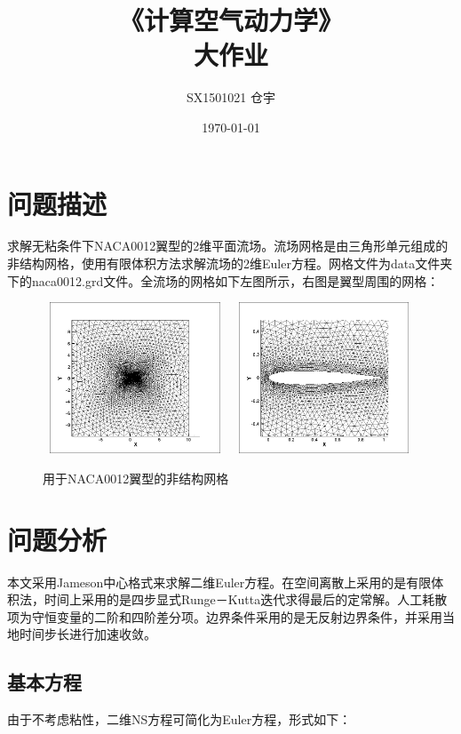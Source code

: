 \documentclass[UTF8]{ctexart}
\title{\heiti 《计算空气动力学》 \\ 大作业}
\author{SX1501021 仓宇}
\date{\today}
\begin{document}
\maketitle
\setcounter{page}{0}
\thispagestyle{empty}
\clearpage

\tableofcontents
\clearpage

\section{问题描述}
求解无粘条件下NACA0012翼型的2维平面流场。流场网格是由三角形单元组成的非结构网格，使用有限体积方法求解流场的2维Euler方程。网格文件为data文件夹下的naca0012.grd文件。全流场的网格如下左图所示，右图是翼型周围的网格：
\begin{figure}[htbp]
\centering\includegraphics[width=5.5cm,height=4.5cm]{../data/mesh_naca0012.png}
\centering\includegraphics[width=5.5cm,height=4.5cm]{../data/mesh_naca0012_local.png}
\caption{用于NACA0012翼型的非结构网格}
\end{figure}

\section{问题分析}
本文采用Jameson中心格式来求解二维Euler方程。在空间离散上采用的是有限体积法，时间上采用的是四步显式Runge－Kutta迭代求得最后的定常解。人工耗散项为守恒变量的二阶和四阶差分项。边界条件采用的是无反射边界条件，并采用当地时间步长进行加速收敛。

\subsection{基本方程}
由于不考虑粘性，二维NS方程可简化为Euler方程，形式如下：
\begin{equation}

\end{equation}
\end{document}
